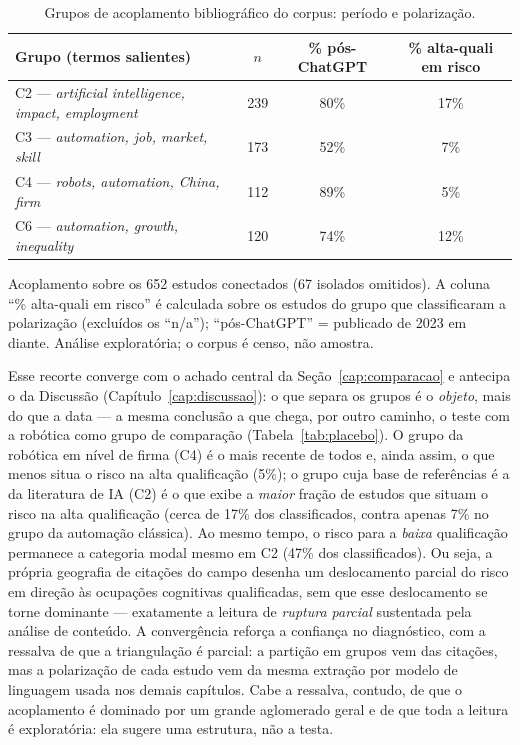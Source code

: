 \begin{table}[htbp]
\centering
\caption{Grupos de acoplamento bibliográfico do corpus: período e polarização.}
\label{tab:acoplamento_clusters}
\begin{tabular}{p{6.0cm}ccc}
\toprule
Grupo (termos salientes) & $n$ & \% pós-ChatGPT & \% alta-quali em risco \\
\midrule
C2 --- \textit{artificial intelligence, impact, employment} & 239 & 80\% & 17\% \\
C3 --- \textit{automation, job, market, skill} & 173 & 52\% & 7\% \\
C4 --- \textit{robots, automation, China, firm} & 112 & 89\% & 5\% \\
C6 --- \textit{automation, growth, inequality} & 120 & 74\% & 12\% \\
\bottomrule
\end{tabular}
\par{\footnotesize Acoplamento sobre os 652 estudos conectados (67 isolados
omitidos). A coluna ``\% alta-quali em risco'' é calculada sobre os estudos do
grupo que classificaram a polarização (excluídos os ``n/a''); ``pós-ChatGPT'' =
publicado de 2023 em diante. Análise
exploratória; o corpus é censo, não amostra.}
\end{table}

Esse recorte converge com o achado central da Seção~\ref{cap:comparacao} e
antecipa o da Discussão (Capítulo~\ref{cap:discussao}): o que separa os grupos
é o \emph{objeto}, mais do que a data --- a mesma conclusão a que chega, por
outro caminho, o teste com a robótica como grupo de comparação
(Tabela~\ref{tab:placebo}). O grupo da robótica em nível de firma (C4)
é o mais recente de todos e, ainda assim, o que menos situa o risco na alta
qualificação (5\%); o grupo cuja base de referências é a da literatura de IA
(C2) é o que exibe a \emph{maior} fração de
estudos que situam o risco na alta qualificação (cerca de 17\% dos classificados,
contra apenas 7\% no grupo da automação clássica). Ao mesmo tempo, o risco para a
\emph{baixa} qualificação permanece a categoria modal mesmo em C2 (47\% dos
classificados). Ou seja, a própria geografia de citações do campo desenha um
deslocamento parcial do risco em direção às ocupações cognitivas qualificadas,
sem que esse deslocamento se torne dominante --- exatamente a leitura de
\emph{ruptura parcial} sustentada pela análise de conteúdo. A convergência
reforça a confiança no diagnóstico, com a ressalva de que a triangulação é
parcial: a partição em grupos vem das citações, mas a polarização de cada estudo
vem da mesma extração por modelo de linguagem usada nos demais capítulos.
Cabe a ressalva, contudo, de que o acoplamento é dominado por um grande
aglomerado geral e de que toda a leitura é exploratória: ela sugere uma
estrutura, não a testa.
